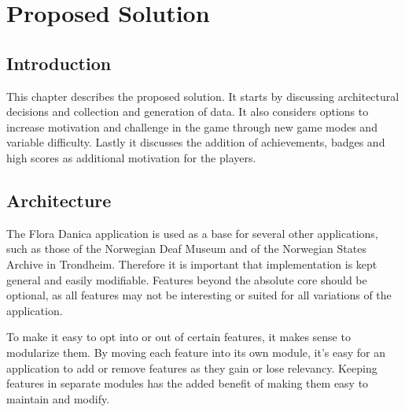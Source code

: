 
\chapter{Proposed Solution}

\label{Chapter3}



\section{Introduction}

This chapter describes the proposed solution. It starts by discussing architectural decisions and collection and generation of data. It also considers options to increase motivation and challenge in the game through new game modes and variable difficulty. Lastly it discusses the addition of achievements, badges and high scores as additional motivation for the players.


\section{Architecture}

The Flora Danica application is used as a base for several other applications, such as those of the Norwegian Deaf Museum and of the Norwegian States Archive in Trondheim. Therefore it is important that implementation is kept general and easily modifiable. Features beyond the absolute core should be optional, as all features may not be interesting or suited for all variations of the application.

To make it easy to opt into or out of certain features, it makes sense to modularize them. By moving each feature into its own module, it's easy for an application to add or remove features as they gain or lose relevancy. Keeping features in separate modules has the added benefit of making them easy to maintain and modify.


